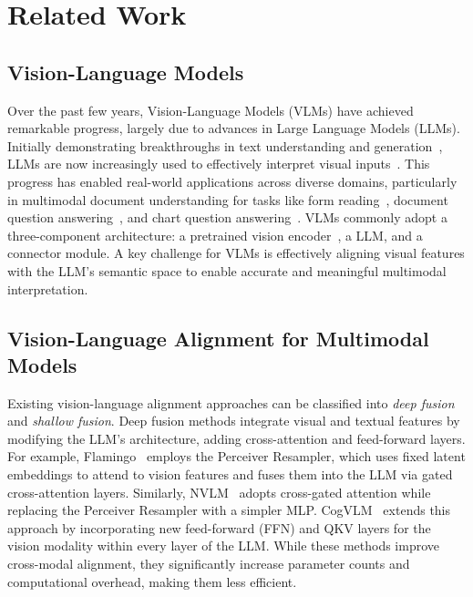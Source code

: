 \section{Related Work}

\subsection{Vision-Language Models}

Over the past few years, Vision-Language Models (VLMs) have achieved remarkable progress, largely due to advances in Large Language Models (LLMs). Initially demonstrating breakthroughs in text understanding and generation~\citep{gpt3, t5, gpt4, llama3, qwen2025qwen25technicalreport, geminiteam2024geminifamilyhighlycapable}, LLMs are now increasingly used to effectively interpret visual inputs~\citep{liu2023llava, llavaonevision, wang2024qwen2vlenhancingvisionlanguagemodels, chen2024internvl, dai2024nvlm, drouin2024workarenacapablewebagents, rodriguez2022ocrvqgan}. This progress has enabled real-world applications across diverse domains, particularly in multimodal document understanding for tasks like form reading~\citep{svetlichnaya2020deepform}, document question answering~\citep{docvqa}, and chart question answering~\citep{masry2022chartqa}. VLMs commonly adopt a three-component architecture: a pretrained vision encoder~\citep{zhai2023sigmoidlosslanguageimage, radford2021learningtransferablevisualmodels}, a LLM, and a connector module. A key challenge for VLMs is effectively aligning visual features with the LLM's semantic space to enable accurate and meaningful multimodal interpretation.



\subsection{Vision-Language Alignment for Multimodal Models}

Existing vision-language alignment approaches can be classified into \emph{deep fusion} and \emph{shallow fusion}. Deep fusion methods integrate visual and textual features by modifying the LLM's architecture, adding cross-attention and feed-forward layers. For example, Flamingo~\citep{flamingo} employs the Perceiver Resampler, which uses fixed latent embeddings to attend to vision features and fuses them into the LLM via gated cross-attention layers. Similarly, NVLM~\citep{dai2024nvlm} adopts cross-gated attention while replacing the Perceiver Resampler with a simpler MLP. CogVLM~\citep{cogvlm:wang2023} extends this approach by incorporating new feed-forward (FFN) and QKV layers for the vision modality within every layer of the LLM. While these methods improve cross-modal alignment, they significantly increase parameter counts and computational overhead, making them less efficient.

